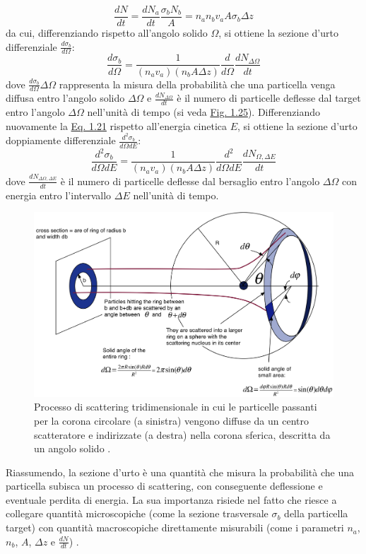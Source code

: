 \documentclass[12pt,a4paper,twoside]{report}
\begin{document}
	\begin{equation}
		\frac{dN}{dt}=\frac{dN_a}{dt}\frac{\sigma_bN_b}{A}=n_an_bv_aA\sigma_b\Delta z
		\label{eq:scattering3}
	\end{equation}
	da cui, differenziando rispetto all'angolo solido $\Omega$, si ottiene la sezione d'urto differenziale $\frac{d\sigma_b}{d\Omega}$:
	\begin{equation}
		\frac{d\sigma_b}{d\Omega}=\frac{1}{\left(n_av_a\right)\left(n_bA\Delta z\right)}\frac{d}{d\Omega}\frac{dN_{\Delta\Omega}}{dt}
		\label{eq:scattering4}
	\end{equation}
	dove $\frac{d\sigma_b}{d\Omega}\Delta \Omega$ rappresenta la misura della probabilità che una particella venga diffusa entro l'angolo solido $\Delta \Omega$ e $\frac{dN_{\Delta\Omega}}{dt}$ è il numero di particelle deflesse dal target entro l'angolo $\Delta \Omega$ nell'unità di tempo (si veda \hyperref[fig:solid_angle]{Fig. 1.25}). Differenziando nuovamente la \hyperref[eq:scattering4]{Eq. 1.21} rispetto all'energia cinetica $E$, si ottiene la sezione d'urto doppiamente differenziale $\frac{d^2\sigma_b}{d\Omega dE}$:
	\begin{equation}
		\frac{d^2\sigma_b}{d\Omega dE}=\frac{1}{\left(n_av_a\right)\left(n_bA\Delta z\right)}\frac{d^2}{d\Omega dE}\frac{dN_{\Omega,\Delta E}}{dt}
		\label{eq:scattering5}
	\end{equation}
	dove $\frac{dN_{\Delta\Omega,\Delta E}}{dt}$ è il numero di particelle deflesse dal bersaglio entro l'angolo $\Delta \Omega$ con energia entro l'intervallo $\Delta E$ nell'unità di tempo.
	\begin{figure}[H]
		\centering
		\includegraphics[width=0.9\linewidth]{solid_angle.png}
		\caption{Processo di scattering tridimensionale in cui le particelle passanti per la corona circolare (a sinistra) vengono diffuse da un centro scatteratore e indirizzate (a destra) nella corona sferica, descritta da un angolo solido \cite{wsuHarr}.}
		\label{fig:solid_angle}
	\end{figure}
	Riassumendo, la sezione d'urto è una quantità che misura la probabilità che una particella subisca un processo di scattering, con conseguente deflessione e eventuale perdita di energia. La sua importanza risiede nel fatto che riesce a collegare quantità microscopiche (come la sezione trasversale $\sigma_b$ della particella target) con quantità macroscopiche direttamente misurabili (come i parametri $n_a$, $n_b$, $A$, $\Delta z$ e $\frac{dN}{dt}$) \cite{sempriniNotes}.
	
\end{document}

